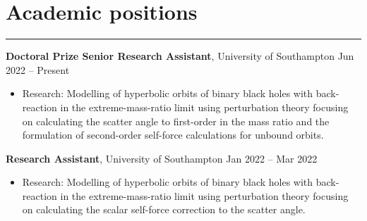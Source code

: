 \documentclass[10.5pt, oneside]{article}   	%
\begin{document}
 
 
\begin{center}
\huge
\href{mailto:O.F.Long@soton.ac.uk}{} \:
\textcolor{Orcidcolour}{\href{https://orcid.org/0000-0002-3897-9272}{}} \:
\textcolor{RGcolour}{\href{https://www.researchgate.net/profile/Oliver-Long-3}{}} \:
\textcolor{LIcolour}{\href{https://www.linkedin.com/in/oliverflong/}{}} \:
\href{https://scholar.google.com/citations?user=92pSUO0AAAAJ&hl=en}{} \:
\href{https://oliverlong.info}{}
\end{center}

 \vspace{1mm}


{\color{Sectioncolour}
\section*{Academic positions}
\vspace{-3mm}
\noindent\rule{\linewidth}{0.6pt}}

\textbf{Doctoral Prize Senior Research Assistant}, University of Southampton \hfill Jun 2022 -- Present \\
\vspace{-5mm}
\begin{itemize}
\item Research: Modelling of hyperbolic orbits of binary black holes with back-reaction in the extreme-mass-ratio limit using perturbation theory focusing on calculating the scatter angle to first-order in the mass ratio and the formulation of second-order self-force calculations for unbound orbits.
\end{itemize}

\textbf{Research Assistant}, University of Southampton \hfill Jan 2022 -- Mar 2022 \\
\vspace{-5mm}
\begin{itemize}
\item Research: Modelling of hyperbolic orbits of binary black holes with back-reaction in the extreme-mass-ratio limit using perturbation theory focusing on calculating the scalar self-force correction to the scatter angle.
\end{itemize}
\end{document}
